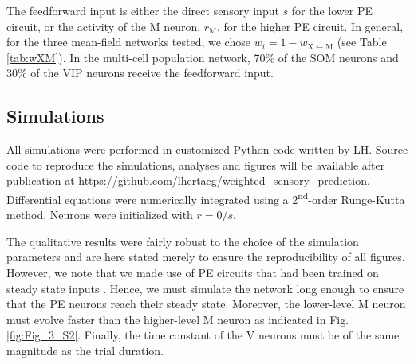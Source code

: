 \documentclass[10pt,a4paper]{article}
\begin{document}
The feedforward input is either the direct sensory input $s$ for the lower PE circuit, or the activity of the M neuron, $r_\mathrm{M}$, for the higher PE circuit. In general, for the three mean-field networks tested, we chose $w_i = 1 - w_\mathrm{X\leftarrow M}$  (see Table \ref{tab:wXM}). In the multi-cell population network, 70\% of the SOM neurons and 30\% of the VIP neurons receive the feedforward input.


\subsection{Simulations}
%
All simulations were performed in customized Python code written by LH. Source code to reproduce the simulations, analyses and figures will be available after publication at \url{https://github.com/lhertaeg/weighted_sensory_prediction}. Differential equations were numerically integrated using a 2\textsuperscript{nd}-order Runge-Kutta method. Neurons were initialized with $r=0/s$. 

The qualitative results were fairly robust to the choice of the simulation parameters and are here stated merely to ensure the reproducibility of all figures. However, we note that we made use of PE circuits that had been trained on steady state inputs \citep{hertag2022prediction}. Hence, we must simulate the network long enough to ensure that the PE neurons reach their steady state. Moreover, the lower-level M neuron must evolve faster than the higher-level M neuron as indicated in Fig. \ref{fig:Fig_3_S2}. Finally, the time constant of the V neurons must be of the same magnitude as the trial duration.
\end{document}
